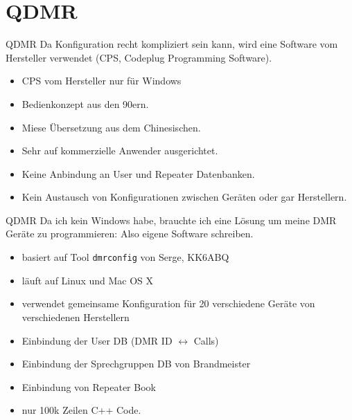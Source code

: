 \documentclass[aspectratio=169]{beamer}
\begin{document}
\section*{QDMR}
\begin{frame}{QDMR}
Da Konfiguration recht kompliziert sein kann, wird eine Software vom Hersteller verwendet (CPS, Codeplug Programming Software).
\begin{itemize}
 \item CPS vom Hersteller nur für Windows
 \item Bedienkonzept aus den 90ern. 
 \item Miese Übersetzung aus dem Chinesischen. 
 \item Sehr auf kommerzielle Anwender ausgerichtet.
 \item Keine Anbindung an User und Repeater Datenbanken.
 \item Kein Austausch von Konfigurationen zwischen Geräten oder gar Herstellern.
\end{itemize}
\end{frame}

\begin{frame}{QDMR}
 Da ich kein Windows habe, brauchte ich eine Lösung um meine DMR Geräte zu programmieren: Also eigene Software schreiben. 
 \begin{itemize}
  \item basiert auf Tool \texttt{dmrconfig} von Serge, KK6ABQ
  \item läuft auf Linux und Mac OS X
  \item verwendet gemeinsame Konfiguration für 20 verschiedene Geräte von verschiedenen Herstellern
  \item Einbindung der User DB (DMR ID $\leftrightarrow$ Calls)
  \item Einbindung der Sprechgruppen DB von Brandmeister
  \item Einbindung von Repeater Book
  \item nur 100k Zeilen C++ Code.
 \end{itemize}
\end{frame}
\end{document}
